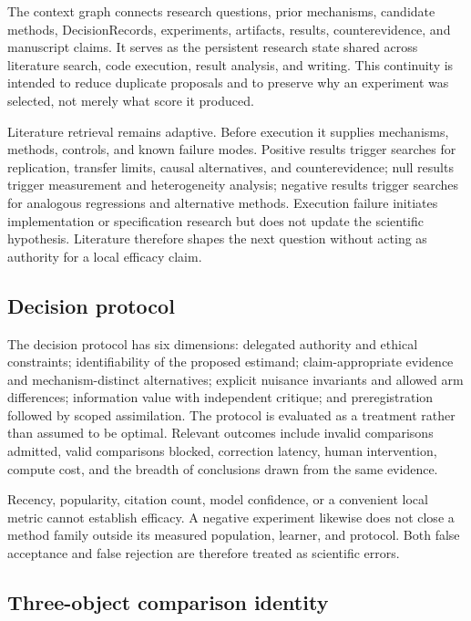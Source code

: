 \documentclass[11pt,a4paper]{article}
\begin{document}
The context graph connects research questions, prior mechanisms, candidate
methods, DecisionRecords, experiments, artifacts, results, counterevidence, and
manuscript claims.  It serves as the persistent research state shared across
literature search, code execution, result analysis, and writing.  This continuity
is intended to reduce duplicate proposals and to preserve why an experiment was
selected, not merely what score it produced.

Literature retrieval remains adaptive.  Before execution it supplies mechanisms,
methods, controls, and known failure modes.  Positive results trigger searches
for replication, transfer limits, causal alternatives, and counterevidence;
null results trigger measurement and heterogeneity analysis; negative results
trigger searches for analogous regressions and alternative methods.  Execution
failure initiates implementation or specification research but does not update
the scientific hypothesis.  Literature therefore shapes the next question
without acting as authority for a local efficacy claim.

\subsection{Decision protocol}

The decision protocol has six dimensions: delegated authority and ethical
constraints; identifiability of the proposed estimand; claim-appropriate evidence
and mechanism-distinct alternatives; explicit nuisance invariants and allowed
arm differences; information value with independent critique; and
preregistration followed by scoped assimilation.  The protocol is evaluated as
a treatment rather than assumed to be optimal.  Relevant outcomes include
invalid comparisons admitted, valid comparisons blocked, correction latency,
human intervention, compute cost, and the breadth of conclusions drawn from the
same evidence.

Recency, popularity, citation count, model confidence, or a convenient local
metric cannot establish efficacy.  A negative experiment likewise does not
close a method family outside its measured population, learner, and protocol.
Both false acceptance and false rejection are therefore treated as scientific
errors.

\subsection{Three-object comparison identity}
\end{document}
